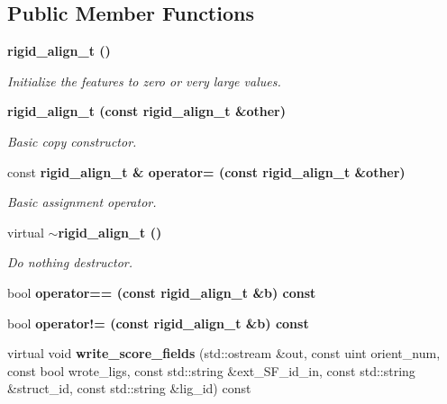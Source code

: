 \subsection*{Public Member Functions}
\begin{CompactItemize}
\item 
\bf{rigid\_\-align\_\-t} ()\label{classSimSite3D_1_1rigid__align__t_e6335cc41892b44aba75afb30c42422b}

\begin{CompactList}\small\item\em Initialize the features to zero or very large values. \item\end{CompactList}\item 
\bf{rigid\_\-align\_\-t} (const \bf{rigid\_\-align\_\-t} \&other)\label{classSimSite3D_1_1rigid__align__t_e05610ac44e3120513667837de227445}

\begin{CompactList}\small\item\em Basic copy constructor. \item\end{CompactList}\item 
const \bf{rigid\_\-align\_\-t} \& \bf{operator=} (const \bf{rigid\_\-align\_\-t} \&other)\label{classSimSite3D_1_1rigid__align__t_e42d7414871c06710daf9f23d71d349d}

\begin{CompactList}\small\item\em Basic assignment operator. \item\end{CompactList}\item 
virtual \bf{$\sim$rigid\_\-align\_\-t} ()\label{classSimSite3D_1_1rigid__align__t_be237ac53c1d6917a5ff2c717574b955}

\begin{CompactList}\small\item\em Do nothing destructor. \item\end{CompactList}\item 
bool \bf{operator==} (const \bf{rigid\_\-align\_\-t} \&b) const 
\item 
bool \bf{operator!=} (const \bf{rigid\_\-align\_\-t} \&b) const 
\item 
virtual void \textbf{write\_\-score\_\-fields} (std::ostream \&out, const uint orient\_\-num, const bool wrote\_\-ligs, const std::string \&ext\_\-SF\_\-id\_\-in, const std::string \&struct\_\-id, const std::string \&lig\_\-id) const \label{classSimSite3D_1_1rigid__align__t_12c292600e42cb9e61a87201d38b574d}


\end{CompactItemize}

